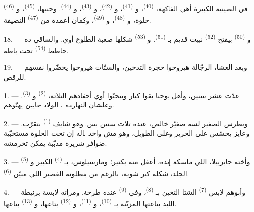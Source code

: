 في الصينية الكبيرة أهي الفاكهة،  \textsuperscript{(40)}،
و \textsuperscript{(41)}، و \textsuperscript{(42)}، و
\textsuperscript{(43)}، و \textsuperscript{(44)}. وجنبها،
 \textsuperscript{(45)}، و \textsuperscript{(46)} حلوة،
و \textsuperscript{(48)}، و \textsuperscript{(49)}،
وكمان أعمدة من  \textsuperscript{(47)} النضيفة.

18. --- و \textsuperscript{(50)} بيفتح  \textsuperscript{(52)}
نبيت قديم بـ \textsuperscript{(51)}. و
\textsuperscript{(53)} شكلها صعبة الطلوع أوي. والساقي ده حاطط 
\textsuperscript{(54)} تحت باطه.

19. --- وبعد العشا، الرجّالة هيروحوا حجرة التدخين، والستّات هيروحوا يحضّروا
نفسهم للرقص.

\VUsaut{5.0mm}
\VUsaut{1.6mm}
\VUsaut{2.6mm}

\VUsaut{3.0mm}

1. --- عدّت عشر سنين، وأهل يوحنا بقوا كبار وبيحبّوا أوي أحفادهم التلاتة،
 \textsuperscript{(2)} و \textsuperscript{(3)}. وعلشان النهارده
، الولاد جايين يهنّوهم.

2. --- وبطرس الصغير لسه صغيّر خالص، عنده تلات سنين بس. وهو شايف
 \textsuperscript{(1)} بتقرّب. وعايز يحسّس على  الحرير وعلى
 الطويل، وهو مش واخد باله إن تحت  الحلوة مستخبّية
ضوافر شريرة مدبّبة يمكن تخرمشه.

3. --- وأخته جابرييلا، اللي ماسكة إيده، أعقل منه بكتير؛ ومارسيلوس،
بـ \textsuperscript{(4)} الكبير و \textsuperscript{(5)} الجلد،
شكله
كبر شوية، بالرغم من بنطلونه القصير اللي مبيّن 
\textsuperscript{(6)}.

4. --- وأبوهم لابس  \textsuperscript{(7)} الشتا التخين
بـ \textsuperscript{(8)}، وفي  \textsuperscript{(9)} عنده
طرحة.
ومراته لابسة برنيطة اللبد بتاعتها المزيّنة بـ \textsuperscript{(10)}،
و \textsuperscript{(11)}، و \textsuperscript{(12)}
بتاعها،
و \textsuperscript{(13)} بتاعها.

